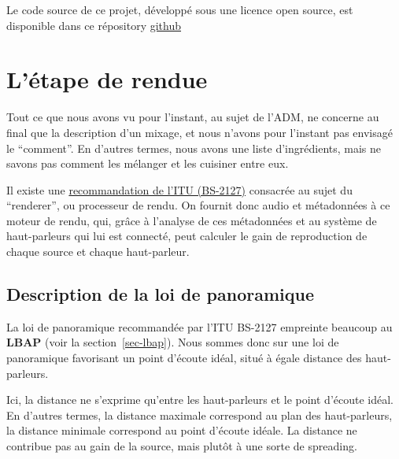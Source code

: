 \documentclass[
  letterpaper,
  DIV=11,
  numbers=noendperiod]{scrreprt}
\begin{document}
Le code source de ce projet, développé sous une licence open source, est
disponible dans ce répository
\href{https://github.com/immersive-audio-live/ADM-OSC}{github}

\hypertarget{luxe9tape-de-rendue}{%
\section{L'étape de rendue}\label{luxe9tape-de-rendue}}

Tout ce que nous avons vu pour l'instant, au sujet de l'ADM, ne concerne
au final que la description d'un mixage, et nous n'avons pour l'instant
pas envisagé le ``comment''. En d'autres termes, nous avons une liste
d'ingrédients, mais ne savons pas comment les mélanger et les cuisiner
entre eux.

Il existe une
\href{https://www.itu.int/rec/r-rec-bs.2127/en}{recommandation de l'ITU
(BS-2127)} consacrée au sujet du ``renderer'', ou processeur de rendu.
On fournit donc audio et métadonnées à ce moteur de rendu, qui, grâce à
l'analyse de ces métadonnées et au système de haut-parleurs qui lui est
connecté, peut calculer le gain de reproduction de chaque source et
chaque haut-parleur.

\hypertarget{description-de-la-loi-de-panoramique}{%
\subsection{Description de la loi de
panoramique}\label{description-de-la-loi-de-panoramique}}

La loi de panoramique recommandée par l'ITU BS-2127 empreinte beaucoup
au \textbf{LBAP} (voir la section~\ref{sec-lbap}). Nous sommes donc sur
une loi de panoramique favorisant un point d'écoute idéal, situé à égale
distance des haut-parleurs.

\begin{tcolorbox}[enhanced jigsaw, leftrule=.75mm, arc=.35mm, bottomtitle=1mm, colback=white, colbacktitle=quarto-callout-note-color!10!white, opacityback=0, left=2mm, rightrule=.15mm, opacitybacktitle=0.6, breakable, toptitle=1mm, titlerule=0mm, bottomrule=.15mm, toprule=.15mm, coltitle=black, title=\textcolor{quarto-callout-note-color}{\faInfo}\hspace{0.5em}{Note}]

Ici, la distance ne s'exprime qu'entre les haut-parleurs et le point
d'écoute idéal. En d'autres termes, la distance maximale correspond au
plan des haut-parleurs, la distance minimale correspond au point
d'écoute idéale. La distance ne contribue pas au gain de la source, mais
plutôt à une sorte de spreading.

\end{tcolorbox}
\end{document}
